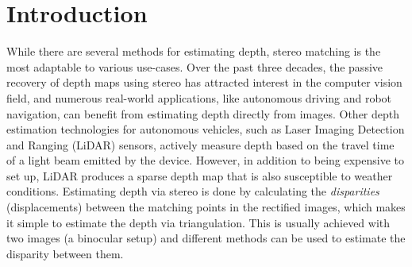 \documentclass[10pt,twocolumn,letterpaper]{article}
\begin{document}
\section{Introduction}
While there are several methods for estimating depth, stereo matching is the most adaptable to various use-cases. Over the past three decades, the passive recovery of depth maps using stereo has attracted interest in the computer vision field, and numerous real-world applications, like autonomous driving and robot navigation, can benefit from estimating depth directly from images. Other depth estimation technologies for autonomous vehicles, such as Laser Imaging Detection and Ranging (LiDAR) sensors, actively measure depth based on the travel time of a light beam emitted by the device. However, in addition to being expensive to set up, LiDAR produces a sparse depth map that is also susceptible to weather conditions. Estimating depth via stereo is done by calculating the \emph{disparities} (displacements) between the matching points in the rectified images, which makes it simple to estimate the depth via triangulation. This is usually achieved with two images (\ie a binocular setup) and different methods can be used to estimate the disparity between them.
\end{document}
